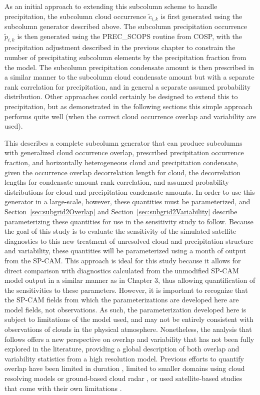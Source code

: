 As an initial approach to extending this subcolumn scheme to handle
precipitation, the subcolumn cloud occurrence \(\tilde{c}_{i, k}\) is
first generated using the subcolumn generator described above. The
subcolumn precipitation occurrence \(\tilde{p}_{i, k}\) is then
generated using the PREC\_SCOPS routine from COSP, with the
precipitation adjustment described in the previous chapter to constrain
the number of precipitating subcolumn elements by the precipitation
fraction from the model. The subcolumn precipitation condensate amount
is then prescribed in a similar manner to the subcolumn cloud condensate
amount but with a separate rank correlation for precipitation, and in
general a separate assumed probability distribution. Other approaches
could certainly be designed to extend this to precipitation, but as
demonstrated in the following sections this simple approach performs
quite well (when the correct cloud occurrence overlap and variability
are used).

This describes a complete subcolumn generator that can produce
subcolumns with generalized cloud occurrence overlap, prescribed
precipitation occurrence fraction, and horizontally heterogeneous cloud
and precipitation condensate, given the occurrence overlap decorrelation
length for cloud, the decorrelation lengths for condensate amount rank
correlation, and assumed probability distributions for cloud and
precipitation condensate amounts. In order to use this generator in a
large-scale, however, these quantities must be parameterized, and
Section~\ref{sec:subgrid2Overlap} and
Section~\ref{sec:subgrid2Variability} describe parameterizing these
quantities for use in the sensitivity study to follow. Because the goal
of this study is to evaluate the sensitivity of the simulated satellite
diagnostics to this new treatment of unresolved cloud and precipitation
structure and variability, these quantities will be parameterized using
a month of output from the SP-CAM. This approach is ideal for this study
because it allows for direct comparison with diagnostics calculated from
the unmodified SP-CAM model output in a similar manner as in Chapter 3,
thus allowing quantification of the sensitivities to these parameters.
However, it is important to recognize that the SP-CAM fields from which
the parameterizations are developed here are model fields, not
observations. As such, the parameterization developed here is subject to
limitations of the model used, and may not be entirely consistent with
observations of clouds in the physical atmosphere. Nonetheless, the
analysis that follows offers a new perspective on overlap and
variability that has not been fully explored in the literature,
providing a global description of both overlap and variability
statistics from a high resolution model. Previous efforts to quantify
overlap have been limited in duration \citep{raisanen_et_al_2004},
limited to smaller domains using cloud resolving models
\citep{pincus_et_al_2005} or ground-based cloud radar
\citep{hogan_and_illingworth_2000, mace_and_benson-troth_2002}, or used
satellite-based studies that come with their own limitations
\citep{barker_2008, oreopoulos_et_al_2012}.

